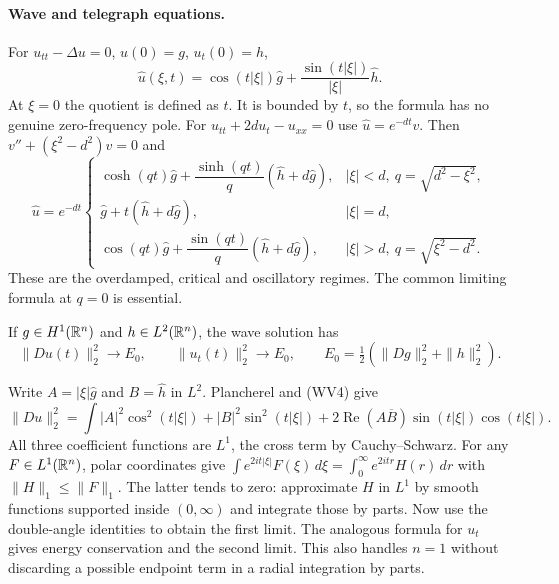 \paragraph{Wave and telegraph equations.}
For $u_{tt}-\Delta u=0$, $u(0)=g$, $u_t(0)=h$,
\[
 \widehat u(\xi,t)=\cos(t|\xi|)\widehat g
              +\frac{\sin(t|\xi|)}{|\xi|}\widehat h.
 \tag{WV4}
\]
At $\xi=0$ the quotient is defined as $t$.
It is bounded by $t$, so the formula has no genuine zero-frequency pole.
For $u_{tt}+2du_t-u_{xx}=0$ use $\widehat u=e^{-dt}v$.
Then $v''+(\xi^2-d^2)v=0$ and
\[
 \widehat u=e^{-dt}
 \begin{cases}
 \cosh(qt)\widehat g+\dfrac{\sinh(qt)}q(\widehat h+d\widehat g),
                 &|\xi|<d,\ q=\sqrt{d^2-\xi^2},\\
 \widehat g+t(\widehat h+d\widehat g),&|\xi|=d,\\
 \cos(qt)\widehat g+\dfrac{\sin(qt)}q(\widehat h+d\widehat g),
                 &|\xi|>d,\ q=\sqrt{\xi^2-d^2}.
 \end{cases}
\]
These are the overdamped, critical and oscillatory regimes.
The common limiting formula at $q=0$ is essential.

\begin{theorem}
If $g\in H^1(\mathbb{R}^n)$ and $h\in L^2(\mathbb{R}^n)$, the wave solution has
\[
 \|Du(t)\|_2^2\longrightarrow E_0,\qquad
 \|u_t(t)\|_2^2\longrightarrow E_0,\qquad
 E_0=\tfrac12(\|Dg\|_2^2+\|h\|_2^2).
\]
\end{theorem}
\begin{expandedproof}
Write $A=|\xi|\widehat g$ and $B=\widehat h$ in $L^2$.
Plancherel and (WV4) give
\[
 \|Du\|_2^2
 =\int|A|^2\cos^2(t|\xi|)+|B|^2\sin^2(t|\xi|)
       +2\operatorname{Re}(A\overline B)\sin(t|\xi|)\cos(t|\xi|).
\]
All three coefficient functions are $L^1$, the cross term by
Cauchy--Schwarz.
For any $F\in L^1(\mathbb{R}^n)$, polar coordinates give
$\int e^{2it|\xi|}F(\xi)\,d\xi=\int_0^\infty e^{2itr}H(r)\,dr$
with $\|H\|_1\leq\|F\|_1$.
The latter tends to zero: approximate $H$ in $L^1$ by smooth functions
supported inside $(0,\infty)$ and integrate those by parts.
Now use the double-angle identities to obtain the first limit.
The analogous formula for $u_t$ gives energy conservation and
the second limit.
This also handles $n=1$ without discarding a possible endpoint term
in a radial integration by parts.
\end{expandedproof}

